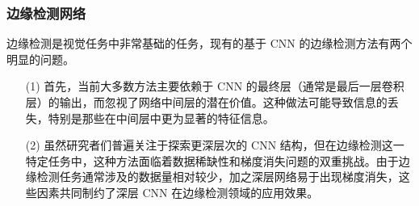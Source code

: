 \documentclass[a4paper]{ctexart}
\begin{document}
	\subsubsection{边缘检测网络}
	
	边缘检测是视觉任务中非常基础的任务，现有的基于 CNN 的边缘检测方法有两个明显的问题。
	
	\begin{itemize}
		\item [(1)] 首先，当前大多数方法主要依赖于 CNN 的最终层（通常是最后一层卷积层）的输出，而忽视了网络中间层的潜在价值。这种做法可能导致信息的丢失，特别是那些在中间层中更为显著的特征信息。
		
		\item [(2)] 虽然研究者们普遍关注于探索更深层次的 CNN 结构，但在边缘检测这一特定任务中，这种方法面临着数据稀缺性和梯度消失问题的双重挑战。由于边缘检测任务通常涉及的数据量相对较少，加之深层网络易于出现梯度消失，这些因素共同制约了深层 CNN 在边缘检测领域的应用效果。
	\end{itemize}
	
\end{document}

